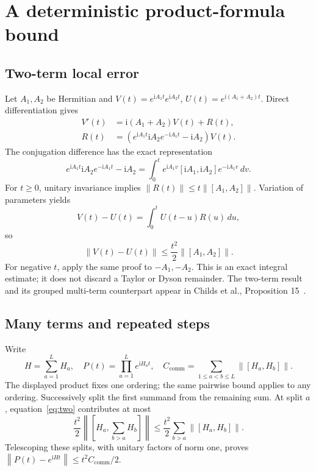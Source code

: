 \documentclass[11pt,a4paper]{article}
\newcommand{\norm}[1]{\left\lVert #1\right\rVert}
\newcommand{\C}{C_{\mathrm{comm}}}
\newcommand{\ip}{\mathrm{i}}
\begin{document}


\section{A deterministic product-formula bound}
\subsection{Two-term local error}
Let $A_1,A_2$ be Hermitian and $V(t)=e^{\ip A_1t}e^{\ip A_2t}$, $U(t)=e^{\ip(A_1+A_2)t}$. Direct differentiation gives
\begin{align}
 V'(t)&=\ip(A_1+A_2)V(t)+R(t),\\
 R(t)&=\left(e^{\ip A_1t}\ip A_2e^{-\ip A_1t}-\ip A_2\right)V(t).
\end{align}
The conjugation difference has the exact representation
\begin{equation}
 e^{\ip A_1t}\ip A_2e^{-\ip A_1t}-\ip A_2
 =\int_0^t e^{\ip A_1v}[\ip A_1,\ip A_2]e^{-\ip A_1v}\,dv.
\end{equation}
For $t\geq0$, unitary invariance implies $\norm{R(t)}\leq t\norm{[A_1,A_2]}$. Variation of parameters yields
\begin{equation}
 V(t)-U(t)=\int_0^t U(t-u)R(u)\,du,
\end{equation}
so
\begin{equation}\label{eq:two}
 \norm{V(t)-U(t)}\leq\frac{t^2}{2}\norm{[A_1,A_2]}.
\end{equation}
For negative $t$, apply the same proof to $-A_1,-A_2$. This is an exact integral estimate; it does not discard a Taylor or Dyson remainder. The two-term result and its grouped multi-term counterpart appear in Childs et al., Proposition 15~\cite{trotter}.

\subsection{Many terms and repeated steps}
Write
\begin{equation}
 H=\sum_{a=1}^L H_a,\quad P(t)=\prod_{a=1}^L e^{\ip H_at},\quad
 \C=\sum_{1\leq a<b\leq L}\norm{[H_a,H_b]}.
\end{equation}
The displayed product fixes one ordering; the same pairwise bound applies to any ordering. Successively split the first summand from the remaining sum. At split $a$, equation~\eqref{eq:two} contributes at most
\begin{equation}
 \frac{t^2}{2}\norm{\left[H_a,\sum_{b>a}H_b\right]}
 \leq\frac{t^2}{2}\sum_{b>a}\norm{[H_a,H_b]}.
\end{equation}
Telescoping these splits, with unitary factors of norm one, proves $\norm{P(t)-e^{\ip Ht}}\leq t^2\C/2$.
\end{document}
